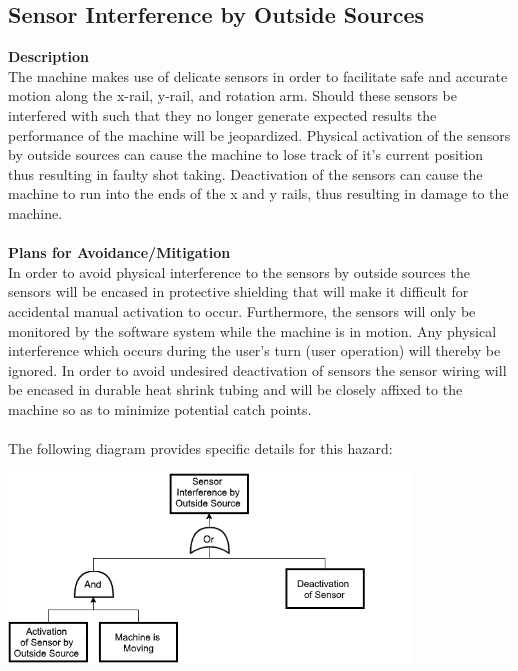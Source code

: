 \documentclass[titlepage]{article}
\begin{document}
\subsection{Sensor Interference by Outside Sources}
\textbf{Description}\\
The machine makes use of delicate sensors in order to facilitate safe and accurate motion along the x-rail, y-rail, and rotation arm. Should these sensors be interfered with such that they no longer generate expected results the performance of the machine will be jeopardized. Physical activation of the sensors by outside sources can cause the machine to lose track of it's current position thus resulting in faulty shot taking. Deactivation of the sensors can cause the machine to run into the ends of the x and y rails, thus resulting in damage to the machine.\\~\\
\textbf{Plans for Avoidance/Mitigation}\\
In order to avoid physical interference to the sensors by outside sources the sensors will be encased in protective shielding that will make it difficult for accidental manual activation to occur. Furthermore, the sensors will only be monitored by the software system while the machine is in motion. Any physical interference which occurs during the user's turn (user operation) will thereby be ignored. In order to avoid undesired deactivation of sensors the sensor wiring will be encased in durable heat shrink tubing and will be closely affixed to the machine so as to minimize potential catch points.\\~\\
The following diagram provides specific details for this hazard:
\begin{center}
	\includegraphics[width=0.8\textwidth]{SensorInterferencerFTA.png}
\label{fig:yRailFig}
\end{center}

\newpage
\end{document}
